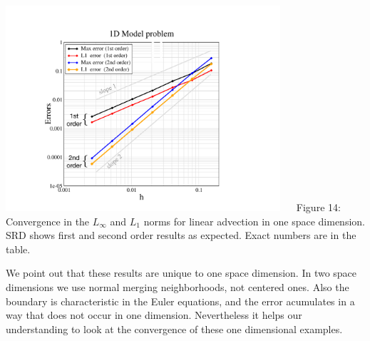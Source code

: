 \begin{minipage}[t][4.in][t]{3.in}
\includegraphics[height=3.0in]{figs/1dconvModel.pdf}
$\quad$ Figure 14: {\sf  Convergence in the $L_{\infty}$ and  $L_1$ norms 
for linear advection in one space dimension. 
SRD shows first and second order results as expected.  Exact numbers are in the table.
\label{fig:1dconv}}
\end{minipage}

We point out that these results are unique to one space dimension.
In two space dimensions we use normal merging neighborhoods, not
centered ones. Also the boundary is characteristic in the Euler
equations, and the error acumulates in a way that
does not occur in one dimension. Nevertheless it helps our
understanding to look at the convergence of these one dimensional examples. 
